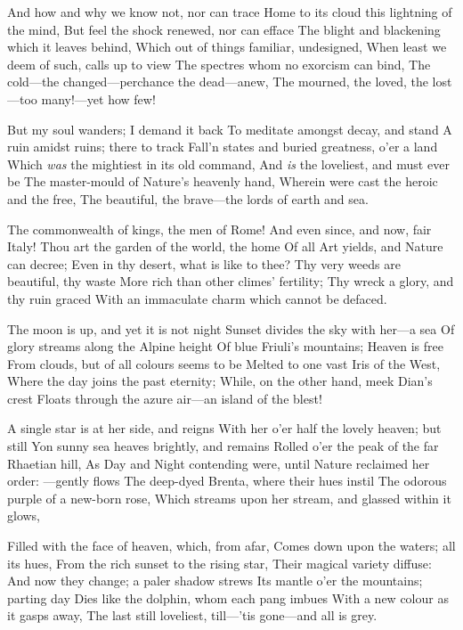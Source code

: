 \documentclass[10pt,twocolumn]{book}
\begin{document}
   And how and why we know not, nor can trace
   Home to its cloud this lightning of the mind,
   But feel the shock renewed, nor can efface
   The blight and blackening which it leaves behind,
   Which out of things familiar, undesigned,
   When least we deem of such, calls up to view
   The spectres whom no exorcism can bind,\textemdash
   The cold---the changed---perchance the dead---anew,
The mourned, the loved, the lost---too many!---yet how few!


   But my soul wanders; I demand it back
   To meditate amongst decay, and stand
   A ruin amidst ruins; there to track
   Fall'n states and buried greatness, o'er a land
   Which \textit{was} the mightiest in its old command,
   And \textit{is} the loveliest, and must ever be
   The master-mould of Nature's heavenly hand,
   Wherein were cast the heroic and the free,
The beautiful, the brave---the lords of earth and sea.


   The commonwealth of kings, the men of Rome!
   And even since, and now, fair Italy!
   Thou art the garden of the world, the home
   Of all Art yields, and Nature can decree;
   Even in thy desert, what is like to thee?
   Thy very weeds are beautiful, thy waste
   More rich than other climes' fertility;
   Thy wreck a glory, and thy ruin graced
With an immaculate charm which cannot be defaced.


   The moon is up, and yet it is not night\textemdash
   Sunset divides the sky with her---a sea
   Of glory streams along the Alpine height
   Of blue Friuli's mountains; Heaven is free
   From clouds, but of all colours seems to be\textemdash
   Melted to one vast Iris of the West,
   Where the day joins the past eternity;
   While, on the other hand, meek Dian's crest
Floats through the azure air---an island of the blest!


   A single star is at her side, and reigns
   With her o'er half the lovely heaven; but still
   Yon sunny sea heaves brightly, and remains
   Rolled o'er the peak of the far Rhaetian hill,
   As Day and Night contending were, until
   Nature reclaimed her order: ---gently flows
   The deep-dyed Brenta, where their hues instil
   The odorous purple of a new-born rose,
Which streams upon her stream, and glassed within it glows,


   Filled with the face of heaven, which, from afar,
   Comes down upon the waters; all its hues,
   From the rich sunset to the rising star,
   Their magical variety diffuse:
   And now they change; a paler shadow strews
   Its mantle o'er the mountains; parting day
   Dies like the dolphin, whom each pang imbues
   With a new colour as it gasps away,
The last still loveliest, till---'tis gone---and all is grey.
\end{document}
